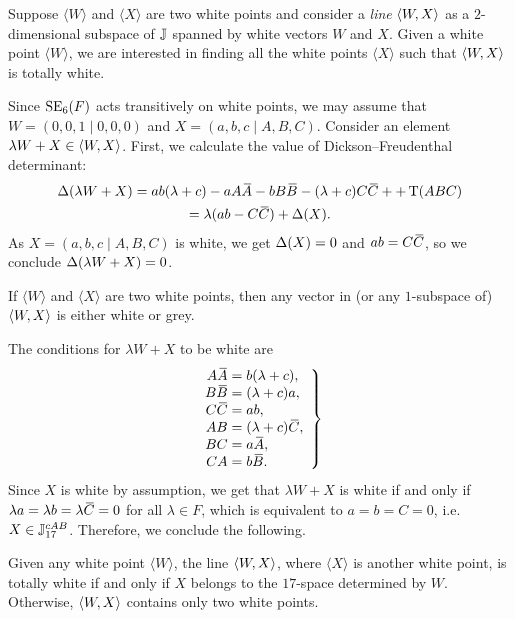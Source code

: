 
Suppose $\langle W \rangle$ and 
$\langle X \rangle$ are two white points and consider a \textit{line} $\langle W, X \rangle$ as 
a \mbox{$2$-dimensional} subspace of $\mathbb{J}$ spanned by white vectors $W$ and $X$. 
Given a white point $\langle W \rangle$, we are interested in finding all
the white points $\langle X \rangle$ such that $\langle W, X \rangle$ is totally white. 

Since $\mathrm{SE}_6(F)$ acts transitively on white points, we may assume that 
$W = (0,0,1\mid 0,0,0)$ and $X = (a,b,c\mid A,B,C)$. 
Consider an element $\lambda W + X \in \langle W, X \rangle$. First, we calculate the 
value of Dickson--Freudenthal determinant:
\begin{multline}
	\fdet( \lambda W + X ) = ab(\lambda + c) - a A \ovA - b B \ovB - (\lambda + c) C \ovC + 
		+ \Tr(ABC) \\
		= \lambda( ab - C\ovC ) + \fdet(X).
\end{multline}
As $X = (a,b,c\mid A,B,C)$ is white, we get $\Delta(X) = 0$ and $ab = C\mathord{\mbox{\hspace*{0pt}}\,\overline{\!C\!\!\;}\!\:}\mbox{\hspace*{0pt}}$, so
we conclude $\Delta( \lambda W + X) = 0$.

\begin{proposition}
	\label{prop:lines}
	If $\langle W \rangle$ and $\langle X \rangle$ are two white points, then any vector in
	(or any $1$-subspace of) $\langle W, X \rangle$ is either white or grey.
\end{proposition}

The conditions for $\lambda W + X$ to be white are
\begin{equation}
	\left.
		\begin{array}{r@{\;}c@{\;}l}
			A\ovA & = & b (\lambda + c), \\
			B\ovB & = & (\lambda + c) a, \\
			C\ovC & = & ab, \\
			AB & = & (\lambda + c) \ovC, \\
			BC & = & a\ovA, \\
			CA & = & b\ovB. 
		\end{array}
	\right\}
\end{equation}
Since $X$ is white by assumption, we get that $\lambda W + X$ is white if and only if
$\lambda a = \lambda b = \lambda \mathord{\mbox{\hspace*{0pt}}\,\overline{\!C\!\!\;}\!\:}\mbox{\hspace*{0pt}} = 0$ for all $\lambda \in F$, which is equivalent to
$a = b = C = 0$, i.e. $X \in \mathbb{J}_{17}^{cAB}$. Therefore, we conclude the following.

\begin{proposition}
	\label{prop:white_lines}
	Given any white point $\langle W \rangle$, the line $\langle W, X \rangle$, where $\langle X \rangle$
	is another white point, is totally white if and only if $X$ belongs to the $17$-space 
	determined by $W$. Otherwise, $\langle W, X \rangle$ contains only two white points. 
\end{proposition}

